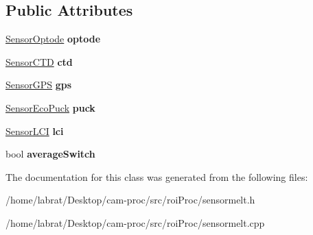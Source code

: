 \subsection*{Public Attributes}
\begin{DoxyCompactItemize}
\item 
\hyperlink{structSensorMelt_1_1SensorOptode}{Sensor\+Optode} {\bfseries optode}\hypertarget{classSensorMelt_ae0063988bded43f7f276d3189cd1cbab}{}\label{classSensorMelt_ae0063988bded43f7f276d3189cd1cbab}

\item 
\hyperlink{structSensorMelt_1_1SensorCTD}{Sensor\+C\+TD} {\bfseries ctd}\hypertarget{classSensorMelt_a10901fdb2ebc391f9ace7aca442cc714}{}\label{classSensorMelt_a10901fdb2ebc391f9ace7aca442cc714}

\item 
\hyperlink{structSensorMelt_1_1SensorGPS}{Sensor\+G\+PS} {\bfseries gps}\hypertarget{classSensorMelt_a7256a26297622176134d700247d46a17}{}\label{classSensorMelt_a7256a26297622176134d700247d46a17}

\item 
\hyperlink{structSensorMelt_1_1SensorEcoPuck}{Sensor\+Eco\+Puck} {\bfseries puck}\hypertarget{classSensorMelt_aecd5fcbde5231feea280afa6c4f68519}{}\label{classSensorMelt_aecd5fcbde5231feea280afa6c4f68519}

\item 
\hyperlink{structSensorMelt_1_1SensorLCI}{Sensor\+L\+CI} {\bfseries lci}\hypertarget{classSensorMelt_a06d5b21e9f457badef3eade0496c04c4}{}\label{classSensorMelt_a06d5b21e9f457badef3eade0496c04c4}

\item 
bool {\bfseries average\+Switch}\hypertarget{classSensorMelt_a4dd8c68b80e0a10d134c628f1d7c69ea}{}\label{classSensorMelt_a4dd8c68b80e0a10d134c628f1d7c69ea}

\end{DoxyCompactItemize}


The documentation for this class was generated from the following files\+:\begin{DoxyCompactItemize}
\item 
/home/labrat/\+Desktop/cam-\/proc/src/roi\+Proc/sensormelt.\+h\item 
/home/labrat/\+Desktop/cam-\/proc/src/roi\+Proc/sensormelt.\+cpp\end{DoxyCompactItemize}
